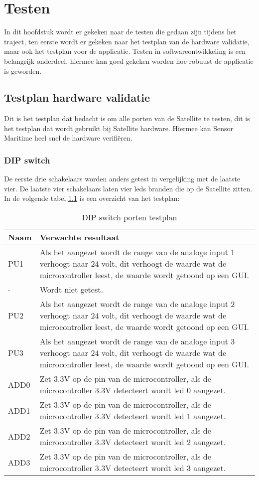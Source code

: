 \chapter{Testen}
In dit hoofdstuk wordt er gekeken naar de testen die gedaan zijn tijdens het traject, ten eerste wordt er gekeken naar het testplan van de hardware validatie, maar ook het testplan voor de applicatie. Testen in softwareontwikkeling is een belangrijk onderdeel, hiermee kan goed gekeken worden hoe robuust de applicatie is geworden.

\section{Testplan hardware validatie} \label{sec:hwtestplan}
Dit is het testplan dat bedacht is om alle porten van de Satellite te testen, dit is het testplan dat wordt gebruikt bij Satellite hardware. Hiermee kan Sensor Maritime heel snel de hardware verifiëren.
\subsection{DIP switch} \label{sec:dip}
De eerste drie schakelaars worden anders getest in vergelijking met de laatste vier. De laatste vier schakelaars laten vier leds branden die op de Satellite zitten. In de volgende tabel \ref{tab:hw_val_dip_testplan} is een overzicht van het testplan:
\begin{table}[h!]
	\caption{DIP switch porten testplan}
	\begin{tabular}{lp{14.5cm}}
	\toprule
	\textbf{Naam} 	& \textbf{Verwachte resultaat} \\ \toprule
	PU1				& Als het aangezet wordt de range van de analoge input 1 verhoogt naar 24 volt, dit verhoogt de waarde wat de microcontroller leest, de waarde wordt getoond op een GUI.\\
	-				& Wordt niet getest. \\
	PU2				& Als het aangezet wordt de range van de analoge input 2 verhoogt naar 24 volt, dit verhoogt de waarde wat de microcontroller leest, de waarde wordt getoond op een GUI.\\
	PU3				& Als het aangezet wordt de range van de analoge input 3 verhoogt  naar 24 volt, dit verhoogt de waarde wat de microcontroller leest, de waarde wordt getoond op een GUI. \\
	ADD0 			& Zet 3.3V op de pin van de microcontroller, als de microcontroller 3.3V detecteert wordt led 0 aangezet.\\
	ADD1 			& Zet 3.3V op de pin van de microcontroller, als de microcontroller 3.3V detecteert wordt led 1 aangezet.\\
	ADD2 			& Zet 3.3V op de pin van de microcontroller, als de microcontroller 3.3V detecteert wordt led 2 aangezet.\\
	ADD3 			& Zet 3.3V op de pin van de microcontroller, als de microcontroller 3.3V detecteert wordt led 3 aangezet.\\ \bottomrule
	\end{tabular}
	\label{tab:hw_val_dip_testplan}
\end{table}

